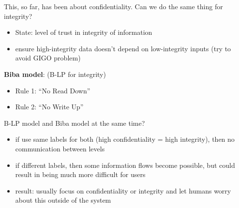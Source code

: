 This, so far, has been about confidentiality. Can we do the same thing for
integrity?
\begin{itemize}
    \item State: level of trust in integrity of information
    \item ensure high-integrity data doesn't depend on low-integrity inputs
        (try to avoid GIGO problem)
\end{itemize}

{\bf Biba model}: (B-LP for integrity)
\begin{itemize}
    \item Rule 1: ``No Read Down''
    \item Rule 2: ``No Write Up''
\end{itemize}

B-LP model and Biba model at the same time?
\begin{itemize}
    \item if use same labels for both (high confidentiality = high integrity),
        then no communication between levels
    \item if different labels, then some information flows become possible, but
        could result in being much more difficult for users
    \item result: usually focus on confidentiality or integrity and let humans
        worry about this outside of the system
\end{itemize}
